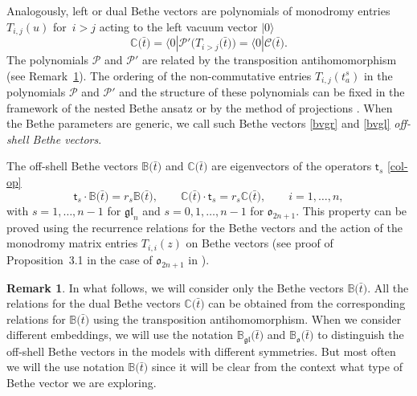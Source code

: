 \documentclass[10pt,a4paper]{amsart}
\newcommand{\bt}{{\bar t}}
\theoremstyle{definition}
\newtheorem{rem}[thm]{Remark}
\def\BB{{\mathbb{B}}}
\def\CC{{\mathbb{C}}}
\def\r#1{\eqref{#1}}
\def\rvec{|0\rangle}
\def\lvec{\langle0|}
\def\BBo{\mathbb{B}_{\mathfrak{o}}}
\def\BBg{\mathbb{B}_{\mathfrak{gl}}}
\begin{document}
Analogously, left or dual Bethe vectors
are polynomials of monodromy entries $T_{i,j}(u)$ for~${i > j}$ acting to the left vacuum vector $\rvec$
\begin{equation}\label{bvgl}
\CC\bigl(\bar t\bigr)=\lvec \mathcal{P}'\bigl(T_{i > j}\bigl(\bar t\bigr)\bigr)=\lvec \mathcal{C}\bigl(\bar t\bigr).
\end{equation}
The polynomials $\mathcal{P}$ and $\mathcal{P}'$ are related by the transposition antihomomorphism (see Remark~\ref{rem21}).
The ordering of the non-commutative entries $T_{i,j}(t^s_a)$ in the polynomials
$\mathcal{P}$ and $\mathcal{P}'$ and the structure
 of these polynomials can be fixed in the framework of the
nested Bethe ansatz \cite{KR1, KR2} or by the method of projections
\cite{HLPRS17,KhP-Kyoto}. When the Bethe parameters
are generic, we call such Bethe vectors \r{bvgr} and \r{bvgl} {\it off-shell Bethe vectors}.

 The off-shell Bethe vectors $\BB\bigl(\bt\bigr)$ and
$\CC\bigl(\bt\bigr)$ are eigenvectors of the operators
$\mathsf{t}_s$ \r{col-op}
\[%
\mathsf{t}_s\cdot\BB\bigl(\bt\bigr)=r_s \BB\bigl(\bt\bigr),\qquad \CC\bigl(\bt\bigr)\cdot\mathsf{t}_s=
r_s \CC\bigl(\bt\bigr),\qquad i=1,\dots,n,
\]
with $s=1,\dots,n-1$ for $\mathfrak{gl}_n$
and $s=0,1,\dots,n-1$ for $\mathfrak{o}_{2n+1}$. This property can be proved
using the recurrence relations for the Bethe vectors and the
action of the monodromy matrix entries $T_{i,i}(z)$ on Bethe vectors
(see proof of Proposition~3.1 in the case of $\mathfrak{o}_{2n+1}$ in \cite{LPR25}).

\begin{rem}\label{rem21}
In what follows, we will consider only the Bethe vectors
$\BB\bigl(\bt\bigr)$. All the relations for the dual Bethe vectors $\CC\bigl(\bt\bigr)$
can be obtained from the corresponding relations for $\BB\bigl(\bt\bigr)$
using the transposition antihomomorphism.
When we consider different embeddings, we will
use the notation $\BBg\bigl(\bt\bigr)$ and $\BBo\bigl(\bt\bigr)$ to distinguish the
off-shell Bethe vectors in the models with different symmetries.
But most often we will the use notation $\BB\bigl(\bt\bigr)$
since it will be clear from the context what type of Bethe
vector we are exploring.
\end{rem}
\end{document}
